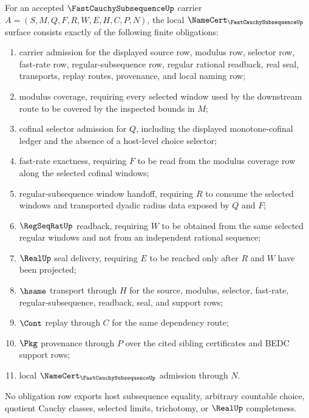 \begin{theorem}
\label{thm:fast-cauchy-subsequence-namecert-obligations}
For an accepted $\FastCauchySubsequenceUp$ carrier $A=(S,M,Q,F,R,W,E,H,C,P,N)$, the local $\NameCert_{\FastCauchySubsequenceUp}$ surface consists exactly of the following finite obligations:
\begin{enumerate}
\item carrier admission for the displayed source row, modulus row, selector row, fast-rate row, regular-subsequence row, regular rational readback, real seal, transports, replay routes, provenance, and local naming row;
\item modulus coverage, requiring every selected window used by the downstream route to be covered by the inspected bounds in $M$;
\item cofinal selector admission for $Q$, including the displayed monotone-cofinal ledger and the absence of a host-level choice selector;
\item fast-rate exactness, requiring $F$ to be read from the modulus coverage row along the selected cofinal windows;
\item regular-subsequence window handoff, requiring $R$ to consume the selected windows and transported dyadic radius data exposed by $Q$ and $F$;
\item $\RegSeqRatUp$ readback, requiring $W$ to be obtained from the same selected regular windows and not from an independent rational sequence;
\item $\RealUp$ seal delivery, requiring $E$ to be reached only after $R$ and $W$ have been projected;
\item $\hsame$ transport through $H$ for the source, modulus, selector, fast-rate, regular-subsequence, readback, seal, and support rows;
\item $\Cont$ replay through $C$ for the same dependency route;
\item $\Pkg$ provenance through $P$ over the cited sibling certificates and BEDC support rows;
\item local $\NameCert_{\FastCauchySubsequenceUp}$ admission through $N$.
\end{enumerate}
No obligation row exports host subsequence equality, arbitrary countable choice, quotient Cauchy classes, selected limits, trichotomy, or $\RealUp$ completeness.
\end{theorem}

